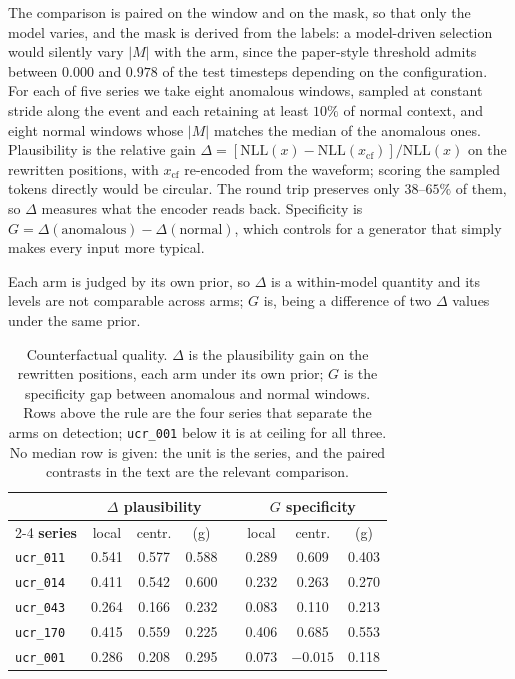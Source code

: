 \documentclass[conference]{IEEEtran}
\begin{document}
The comparison is paired on the window and on the mask, so that only the model varies, and the mask
is derived from the labels: a model-driven selection would silently vary $|M|$ with the arm, since
the paper-style threshold admits between $0.000$ and $0.978$ of the test timesteps depending on the
configuration. For each of five series we take eight anomalous windows, sampled at constant stride
along the event and each retaining at least $10\%$ of normal context, and eight normal windows whose
$|M|$ matches the median of the anomalous ones. Plausibility is the relative gain
$\Delta = [\mathrm{NLL}(x)-\mathrm{NLL}(x_{\mathrm{cf}})]/\mathrm{NLL}(x)$ on the rewritten
positions, with $x_{\mathrm{cf}}$ re-encoded from the waveform; scoring the sampled tokens directly
would be circular. The round trip preserves only $38$--$65\%$ of them, so $\Delta$ measures what the
encoder reads back. Specificity is $G = \Delta(\text{anomalous}) - \Delta(\text{normal})$, which
controls for a generator that simply makes every input more typical.

Each arm is judged by its own prior, so $\Delta$ is a within-model quantity and its levels are not
comparable across arms; $G$ is, being a difference of two $\Delta$ values under the same prior.

\begin{table}[t]
\caption{Counterfactual quality. $\Delta$ is the plausibility gain on the rewritten positions, each
arm under its own prior; $G$ is the specificity gap between anomalous and normal windows. Rows above
the rule are the four series that separate the arms on detection; \texttt{ucr\_001} below it is at
ceiling for all three. No median row is given: the unit is the series, and the paired contrasts in
the text are the relevant comparison.}
\label{tab:cf}
\centering
\scriptsize
\setlength{\tabcolsep}{4pt}
\renewcommand{\arraystretch}{1.1}
\begin{tabular}{@{}l ccc c ccc@{}}
\hline
& \multicolumn{3}{c}{\textbf{$\Delta$ plausibility}}
& & \multicolumn{3}{c}{\textbf{$G$ specificity}} \\
\cline{2-4}\cline{6-8}
\textbf{series} & local & centr. & (g) & & local & centr. & (g) \\
\hline
\texttt{ucr\_011} & 0.541 & 0.577 & 0.588 & & 0.289 & 0.609 & 0.403 \\
\texttt{ucr\_014} & 0.411 & 0.542 & 0.600 & & 0.232 & 0.263 & 0.270 \\
\texttt{ucr\_043} & 0.264 & 0.166 & 0.232 & & 0.083 & 0.110 & 0.213 \\
\texttt{ucr\_170} & 0.415 & 0.559 & 0.225 & & 0.406 & 0.685 & 0.553 \\
\hline
\texttt{ucr\_001} & 0.286 & 0.208 & 0.295 & & 0.073 & $-0.015$ & 0.118 \\
\hline
\end{tabular}
\end{table}
\end{document}
